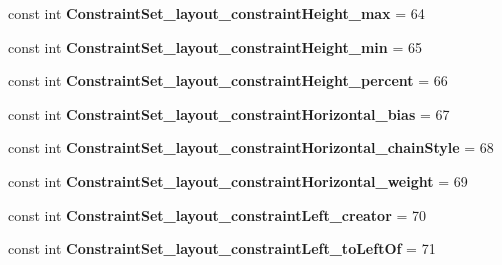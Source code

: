 \begin{DoxyCompactItemize}
\mbox{\label{classst_delivery_1_1_resource_1_1_styleable_a9d4a27a398e01a07c4ef69b42cd52fc4}} 
const int {\bfseries Constraint\+Set\+\_\+layout\+\_\+constraint\+Height\+\_\+max} = 64
\item 
\mbox{\label{classst_delivery_1_1_resource_1_1_styleable_a3d65505ec01a2efef53913c1034a7359}} 
const int {\bfseries Constraint\+Set\+\_\+layout\+\_\+constraint\+Height\+\_\+min} = 65
\item 
\mbox{\label{classst_delivery_1_1_resource_1_1_styleable_a3798b89539b8bcd0b6986e822902d9fd}} 
const int {\bfseries Constraint\+Set\+\_\+layout\+\_\+constraint\+Height\+\_\+percent} = 66
\item 
\mbox{\label{classst_delivery_1_1_resource_1_1_styleable_ae3abd2f66fdc330f56c09dab4f1f4896}} 
const int {\bfseries Constraint\+Set\+\_\+layout\+\_\+constraint\+Horizontal\+\_\+bias} = 67
\item 
\mbox{\label{classst_delivery_1_1_resource_1_1_styleable_a24e921f5fa01bf4efe03f2adc4f12902}} 
const int {\bfseries Constraint\+Set\+\_\+layout\+\_\+constraint\+Horizontal\+\_\+chain\+Style} = 68
\item 
\mbox{\label{classst_delivery_1_1_resource_1_1_styleable_a5a47fbcf49d5257dcd46e30405fd6112}} 
const int {\bfseries Constraint\+Set\+\_\+layout\+\_\+constraint\+Horizontal\+\_\+weight} = 69
\item 
\mbox{\label{classst_delivery_1_1_resource_1_1_styleable_a9d6ff1d391cda514261a319b6846b8cd}} 
const int {\bfseries Constraint\+Set\+\_\+layout\+\_\+constraint\+Left\+\_\+creator} = 70
\item 
\mbox{\label{classst_delivery_1_1_resource_1_1_styleable_a73f2deb9c88d7ee06bd774773b9f4466}} 
const int {\bfseries Constraint\+Set\+\_\+layout\+\_\+constraint\+Left\+\_\+to\+Left\+Of} = 71
\item 
\mbox{\label{classst_delivery_1_1_resource_1_1_styleable_a24c32b8372530236455d209ba2a5e9df}} 

\end{DoxyCompactItemize}

